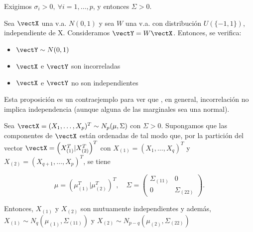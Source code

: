   \begin{nota}
Exigimos $\sigma_i > 0, \ \forall i = 1,\dots, p$, y entonces $\Sigma > 0$.
  \end{nota}

  \begin{nprop}
    Sea $\vectX$ una v.a. $N(0,1)$ y sea $W$ una v.a. con distribución $U(\{-1,1\})$, independiente de X. Consideramos $\vectY = W\vectX$. Entonces, se verifica:
    \begin{itemize}
    \item $\vectY \sim N(0,1)$
    \item $\vectX$ e $\vectY$ son incorreladas
      \item $\vectX$ e $\vectY$ no son independientes 
    \end{itemize}

  \end{nprop}
  Esta proposición es un contraejemplo para ver que , en general, incorrelación no implica independencia (aunque alguna de las marginales sea una normal).

  \begin{nth} \label{independenciacovbloques}
    Sea $\vectX = (X_1, \dots ,X_p)^T \sim N_p(\mu,\Sigma)$ con $\Sigma > 0$. Supongamos que las componentes de $\vectX$ están ordenadas de tal modo que, por la partición del vector $\vectX = \left(X_{(1)}^T | X_{(2)}^T\right)^T$ con $X_{(1)} = (X_1,\dots,X_q)^T$ y $X_{(2)} = (X_{q+1},\dots,X_p)^T$, se tiene
    
    \[
    \mu = \left(\mu_{(1)}^T | \mu_{(2)}^T\right)^T, \quad \Sigma = \begin{pmatrix} \Sigma_{(11)} & 0 \\ 0 & \Sigma_{(22)} \end{pmatrix}
    .\]
    
    Entonces, $X_{(1)}$ y $X_{(2)}$ son mutuamente independientes y además, $X_{(1)} \sim N_q(\mu_{(1)}, \Sigma_{(11)})$ y $X_{(2)} \sim N_{p-q}(\mu_{(2)}, \Sigma_{(22)})$
  \end{nth}

